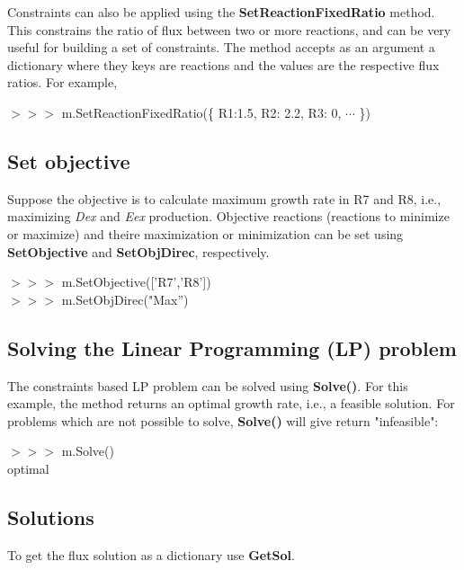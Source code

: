 Constraints can also be applied using the \textbf{SetReactionFixedRatio} method. This constrains the ratio of flux between two or more reactions, and can be very useful for building a set of constraints. The method accepts as an argument a dictionary where they keys are reactions and the values are the respective flux ratios. For example,

\begin{framed}
$>>>$ m.SetReactionFixedRatio(\{ R1:1.5, R2: 2.2, R3: 0, $\cdots$ \})
\end{framed}


\subsection{Set objective}
Suppose the objective is to calculate maximum growth rate in R7 and R8, i.e., maximizing \textit{Dex} and \textit{Eex} production. Objective reactions (reactions to minimize or maximize) and theire maximization or minimization can be set using \textbf{SetObjective} and \textbf{SetObjDirec}, respectively.

\begin{framed}
$>>>$ m.SetObjective(['R7','R8'])\\
$>>>$ m.SetObjDirec("Max'')
\end{framed}


\subsection{Solving the Linear Programming (LP) problem}
The constraints based LP problem can be solved using \textbf{Solve()}. For this example, the method returns an optimal growth rate, i.e., a feasible solution. For problems which are not possible to solve, \textbf{Solve()} will give return "infeasible":

\begin{framed}
$>>>$ m.Solve()\\
optimal
\end{framed}


\subsection{Solutions}
To get the flux solution as a dictionary use \textbf{GetSol}.

